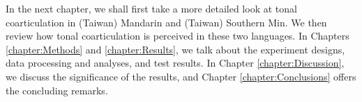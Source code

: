 In the next chapter, we shall first take a more detailed look at tonal coarticulation in (Taiwan) Mandarin and (Taiwan) Southern Min. We then review how tonal coarticulation is perceived in these two languages. In Chapters \ref{chapter:Methods} and \ref{chapter:Results}, we talk about the experiment designs, data processing and analyses, and test results. In Chapter \ref{chapter:Discussion}, we discuss the significance of the results, and Chapter \ref{chapter:Conclusions} offers the concluding remarks.
